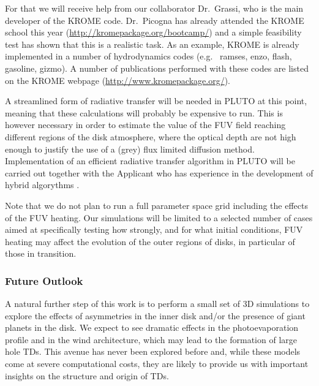 \documentclass[10pt,fleqn,twoside]{article}
\begin{document}
 For 
that we will receive help from our collaborator Dr.\ Grassi, who is the main
developer of the KROME code. Dr.\ Picogna has already attended the KROME
school this year (\url{http://kromepackage.org/bootcamp/}) and a simple
feasibility test has shown that this is a realistic task. As an example,
KROME is already implemented in a number of hydrodynamics codes (e.g.\ {\sc
  ramses, enzo, flash, gasoline, gizmo}). A number of publications performed
with these codes are listed on the KROME webpage
(\url{http://www.kromepackage.org/}).

A streamlined form of radiative transfer
will be needed in PLUTO at this point, meaning that these calculations will
probably be expensive to run.  This is however necessary in order to
estimate the value of the  FUV field reaching different regions of the
disk atmosphere, where the optical depth are not high enough to
justify the use of a  (grey) flux limited diffusion method.
Implementation of an efficient radiative transfer algorithm in PLUTO
will be carried out together with the Applicant who has experience in the
development of hybrid algorythms 
\citep[e.g.,][]{2014ASSP...36..127O}.

Note that we do not plan to run a full
parameter space grid including the effects of the FUV heating. 
Our simulations will be limited to a selected number of cases
aimed at specifically testing how strongly, and for what initial
conditions, FUV heating may affect the evolution of the outer regions
of disks, in particular of those in transition.\\

\subsubsection{Future Outlook}

A natural further step of this work is to perform a small set of 3D
simulations to explore the effects of asymmetries in the inner
disk and/or the presence of giant planets in the disk. We expect to
see dramatic effects in the photoevaporation 
profile and in the wind architecture, which may lead to the formation
of large hole TDs. This avenue has never been explored before and,
while these models come at severe computational costs, they are likely to provide us
with important insights on the structure and origin of TDs. 
\end{document}
